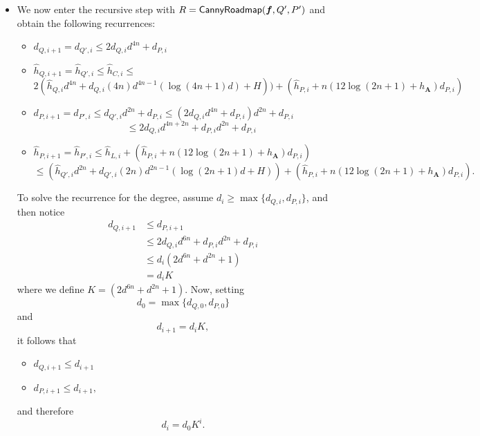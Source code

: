 \documentclass[12pt]{article}
\def\mA{{\bm A}}
\def\CannyRoadmapL{{\sf CannyRoadmap}}
\def\mA{{\bm A}}
\begin{document}
\begin{itemize}
\begin{enumerate}
    
\end{enumerate}





\item We now enter the recursive step with $R = \CannyRoadmapL(\bm f, Q', P')$ and obtain the following recurrences:
%
\begin{itemize} %
    \item $d_{Q,i+1} = d_{Q',i}\leq 2d_{Q,i}d^{4n} + d_{P,i}$
    \item $\hat{h}_{Q,i+1} = \hat{h}_{Q',i}\leq \hat{h}_{C,i}\leq$
    \[
    2(\hat{h}_{Q,i}d^{4n} + d_{Q,i} (4n)d^{4n-1}(\log(4n+1)d) + H)) + (\hat{h}_{P,i}+n(12\log(2n+1)+h_{\mA})d_{P,i})  
    \]
    \item $d_{P,i+1} = d_{P',i} \leq d_{Q',i}d^{2n}+d_{P,i}\leq (2d_{Q,i}d^{4n} + d_{P,i})d^{2n}+d_{P,i}$
    \[
    \leq 2d_{Q,i}d^{4n+2n}+d_{P,i}d^{2n}+d_{P,i}
    \]
    \item $\hat{h}_{P,i+1} = \hat{h}_{P',i}\leq \hat{h}_{L,i}+(\hat{h}_{P,i}+n(12\log(2n+1)+h_{\mA})d_{P,i})$
    \[
    \leq \left(\hat{h}_{Q',i}d^{2n} + d_{Q',i} (2n)d^{2n-1}(\log(2n+1)d + H)\right)
    +(\hat{h}_{P,i}+n(12\log(2n+1)+h_{\mA})d_{P,i}).  
    \]
\end{itemize}
To solve the recurrence for the degree, assume $d_{i}\geq \max\{d_{Q,i},d_{P,i}\}$, and then notice
%
\begin{align*}
    d_{Q,i+1} &\leq d_{P,i+1}\\
    &\leq 2d_{Q,i}d^{6n}+d_{P,i}d^{2n}+d_{P,i}\\
&\leq d_i(2d^{6n} + d^{2n} + 1)\\
&= d_iK
\end{align*}
%
where we define  $K = (2d^{6n}+d^{2n}+1)$. Now, setting 
\[
d_0 = \max\{d_{Q,0},d_{P,0}\}
\]
and
\[
d_{i+1} = d_iK,
\]
it follows that 
\begin{itemize}
    \item $d_{Q,i+1} \leq d_{i+1}$
    \item $d_{P,i+1} \leq d_{i+1},$
\end{itemize}
and therefore
\[
d_i = d_0K^i.
\]













\end{itemize}
\end{document}
